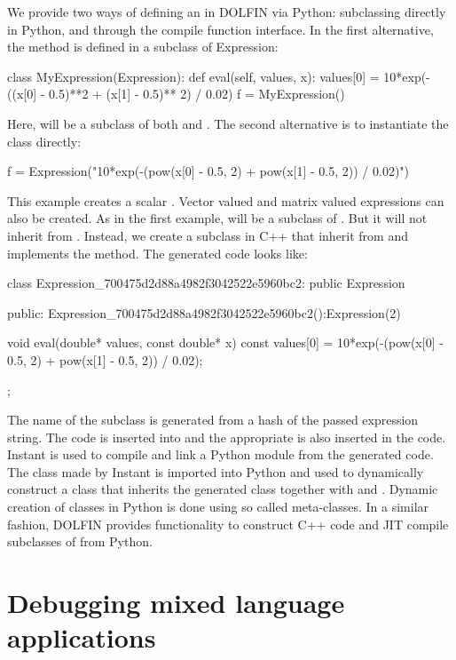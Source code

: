 We provide two ways of defining an  in DOLFIN via Python:
subclassing  directly in Python, and through the compile
function interface. In the first alternative, the  method is
defined in a subclass of Expression:
\begin{python}
class MyExpression(Expression):
    def eval(self, values, x):
        values[0] = 10*exp(-((x[0] - 0.5)**2 + (x[1] - 0.5)** 2) / 0.02)
f = MyExpression()
\end{python}
Here,  will be a subclass of both  and
.  The second alternative is to instantiate the
 class directly:
\begin{python}
f = Expression("10*exp(-(pow(x[0] - 0.5, 2) + pow(x[1] - 0.5, 2)) / 0.02)")
\end{python}
This example creates a scalar . Vector valued and matrix
valued expressions can also be created. As in the first example, 
will be a subclass of . But it will not inherit from
.  Instead, we create a subclass in C++ that inherit
from  and implements the  method.
The generated code looks like:
\begin{c++}
class Expression_700475d2d88a4982f3042522e5960bc2: public Expression{
public:
  Expression_700475d2d88a4982f3042522e5960bc2():Expression(2){}

  void eval(double* values, const double* x) const{
    values[0] = 10*exp(-(pow(x[0] - 0.5, 2) + pow(x[1] - 0.5, 2)) / 0.02);
  }
};
\end{c++}
The name of the subclass is generated from a hash of the passed
expression string. The code is inserted into  and
the appropriate  is also inserted in the code. Instant is
used to compile and link a Python module from the generated code. The
class made by Instant is imported into Python and used to dynamically
construct a class that inherits the generated class together with
 and .  Dynamic creation of classes
in Python is done using so called meta-classes.  In a similar fashion,
DOLFIN provides functionality to construct C++ code and JIT compile
subclasses of  from Python.


\section{Debugging mixed language applications}


